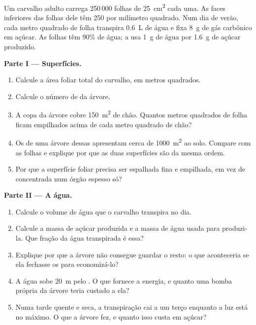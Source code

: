 \begin{problem}
\label{pb:g12:plant-rooted-life:1}
Um carvalho adulto carrega 250\,000 folhas de \qty{25}{cm^2} cada uma.
As faces inferiores das folhas dele têm 250  por milímetro
quadrado. Num dia de verão, cada metro quadrado de folha transpira
\qty{0.6}{L} de água e fixa \qty{8}{g} de gás carbônico em açúcar. As
folhas têm 90\% de água; a  usa \qty{1}{g} de água por
\qty{1.6}{g} de açúcar produzido.

\medskip
\noindent\textbf{Parte I --- Superfícies.}
\begin{enumerate}
  \item Calcule a área foliar total do carvalho, em metros quadrados.
  \item Calcule o número de  da árvore.
  \item A copa da árvore cobre \qty{150}{m^2} de chão. Quantos metros
        quadrados de folha ficam empilhados acima de cada metro
        quadrado de chão?
  \item Os  de uma árvore dessas apresentam cerca de
        \qty{1000}{m^2} ao solo. Compare com as folhas e explique por
        que as duas superfícies são da mesma ordem.
  \item Por que a superfície foliar precisa ser espalhada fina e
        empilhada, em vez de concentrada num órgão espesso só?
\end{enumerate}

\medskip
\noindent\textbf{Parte II --- A água.}
\begin{enumerate}[resume]
  \item Calcule o volume de água que o carvalho transpira no dia.
  \item Calcule a massa de açúcar produzida e a massa de água usada
        para produzi-la. Que fração da água transpirada é essa?
  \item Explique por que a árvore não consegue guardar o resto: o que
        aconteceria se ela fechasse os  para economizá-lo?
  \item A água sobe \qty{20}{m} pelo . O que fornece a energia, e
        quanto uma bomba própria da árvore teria custado a ela?
  \item Numa tarde quente e seca, a transpiração cai a um terço
        enquanto a luz está no máximo. O que a árvore fez, e quanto
        isso custa em açúcar?
\end{enumerate}


\end{problem}
